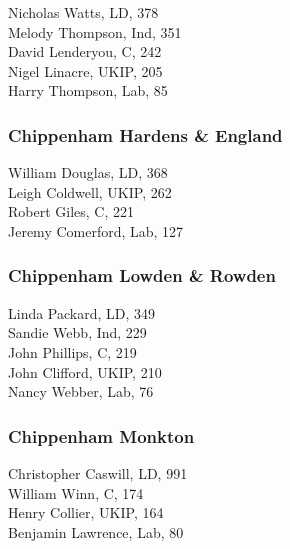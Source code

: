 \documentclass[a4paper,openany,10pt]{book}
\begin{document}


Nicholas Watts, LD, 378\\
Melody Thompson, Ind, 351\\
David Lenderyou, C, 242\\
Nigel Linacre, UKIP, 205\\
Harry Thompson, Lab, 85\\


\subsubsection*{Chippenham Hardens \& England}



William Douglas, LD, 368\\
Leigh Coldwell, UKIP, 262\\
Robert Giles, C, 221\\
Jeremy Comerford, Lab, 127\\


\subsubsection*{Chippenham Lowden \& Rowden}



Linda Packard, LD, 349\\
Sandie Webb, Ind, 229\\
John Phillips, C, 219\\
John Clifford, UKIP, 210\\
Nancy Webber, Lab, 76\\


\subsubsection*{Chippenham Monkton}



Christopher Caswill, LD, 991\\
William Winn, C, 174\\
Henry Collier, UKIP, 164\\
Benjamin Lawrence, Lab, 80\\
\end{document}
